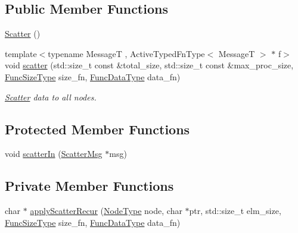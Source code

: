 \subsection*{Public Member Functions}
\begin{DoxyCompactItemize}
\item 
\hyperlink{structvt_1_1collective_1_1scatter_1_1_scatter_a33ea9a78c5d43dcea4ec2cb69d8b00b4}{Scatter} ()
\item 
{\footnotesize template$<$typename MessageT , Active\+Typed\+Fn\+Type$<$ Message\+T $>$ $\ast$ f$>$ }\\void \hyperlink{structvt_1_1collective_1_1scatter_1_1_scatter_a0873f5fd4b890ad95e6ed6c097efe8bd}{scatter} (std\+::size\+\_\+t const \&total\+\_\+size, std\+::size\+\_\+t const \&max\+\_\+proc\+\_\+size, \hyperlink{structvt_1_1collective_1_1scatter_1_1_scatter_a977d895e42999a4078c6705ac851f447}{Func\+Size\+Type} size\+\_\+fn, \hyperlink{structvt_1_1collective_1_1scatter_1_1_scatter_a4040244e8ed36afd5d408c27efceea1b}{Func\+Data\+Type} data\+\_\+fn)
\begin{DoxyCompactList}\small\item\em \hyperlink{structvt_1_1collective_1_1scatter_1_1_scatter}{Scatter} data to all nodes. \end{DoxyCompactList}\end{DoxyCompactItemize}
\subsection*{Protected Member Functions}
\begin{DoxyCompactItemize}
\item 
void \hyperlink{structvt_1_1collective_1_1scatter_1_1_scatter_aa80a957377cce3126058f3d7d30d2fed}{scatter\+In} (\hyperlink{structvt_1_1collective_1_1scatter_1_1_scatter_msg}{Scatter\+Msg} $\ast$msg)
\end{DoxyCompactItemize}
\subsection*{Private Member Functions}
\begin{DoxyCompactItemize}
\item 
char $\ast$ \hyperlink{structvt_1_1collective_1_1scatter_1_1_scatter_a0e838718a3f3ad28aef779c4ea4a985f}{apply\+Scatter\+Recur} (\hyperlink{namespacevt_a866da9d0efc19c0a1ce79e9e492f47e2}{Node\+Type} node, char $\ast$ptr, std\+::size\+\_\+t elm\+\_\+size, \hyperlink{structvt_1_1collective_1_1scatter_1_1_scatter_a977d895e42999a4078c6705ac851f447}{Func\+Size\+Type} size\+\_\+fn, \hyperlink{structvt_1_1collective_1_1scatter_1_1_scatter_a4040244e8ed36afd5d408c27efceea1b}{Func\+Data\+Type} data\+\_\+fn)
\end{DoxyCompactItemize}
